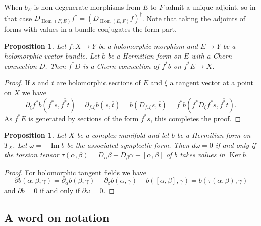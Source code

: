 \documentclass[10pt,a4paper]{amsart}
\newtheorem{prop}[theo]{Proposition}
\theoremstyle{definition}
\def\ov#1{\overline{#1}}
\DeclareMathOperator{\Ker}{Ker}
\DeclareMathOperator{\Hom}{Hom}
\begin{document}
When $b_E$ is non-degenerate morphisms from $E$ to $F$ admit a unique adjoint, so in that case $D_{\Hom(F,E)}f^\dagger = (D_{\Hom(E,F)}f)^\dagger$. Note that taking the adjoints of forms with values in a bundle conjugates the form part.



\begin{prop}
Let $f : X \to Y$ be a holomorphic morphism and $E \to Y$ be a holomorphic vector bundle.
Let $b$ be a Hermitian form on $E$ with a Chern connection $D$.
Then $f^{*}D$ is a Chern connection of $f^{*}b$ on $f^{*}E \to X$.
\end{prop}


\begin{proof}
If $s$ and $t$ are holomorphic sections of $E$ and $\xi$ a tangent vector at a
point on $X$ we have
\[
\partial_{\xi} f^{*} b(f^{*}s, \overline{f^{*}t})
= \partial_{f_{*}\xi} b(s, \overline t)
= b(D_{f_{*}\xi}s, \overline{t})
= f^{*}b(f^{*}D_{\xi} f^{*}s, \overline{f^{*}t}).
\]
As $f^{*}E$ is generated by sections of the form $f^{*}s$, this completes the proof.
\end{proof}



\begin{prop}
Let $X$ be a complex manifold and let $b$ be a Hermitian form on $T_X$.
Let $\omega = -\operatorname{Im} b$ be the associated symplectic form.
Then $d \omega = 0$ if and only if the torsion tensor $\tau(\alpha,\beta) = D_\alpha \beta - D_\beta \alpha - [\alpha, \beta]$ of $b$ takes values in $\Ker b$.
\end{prop}

\begin{proof}
For holomorphic tangent fields we have
\[
\partial b (\alpha, \beta, \ov \gamma)
= \partial_\alpha b(\beta, \ov\gamma)
- \partial_\beta b(\alpha, \ov\gamma)
- b([\alpha,\beta], \ov\gamma)
= b(\tau(\alpha,\beta), \ov\gamma)
\]
and $\partial b = 0$ if and only if $\partial \omega = 0$.
\end{proof}



\subsection*{A word on notation}
\end{document}

